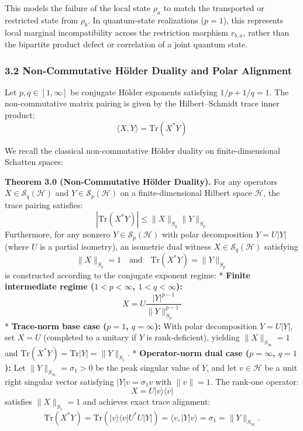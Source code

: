 \documentclass[
]{article}
\begin{document}
This models the failure of the local state \(\rho_a\) to match the transported or restricted state from \(\rho_b\). In quantum-state realizations (\(p=1\)), this represents local marginal incompatibility across the restriction morphism \(r_{b,a}\), rather than the bipartite product defect or correlation of a joint quantum state.

\subsubsection{3.2 Non-Commutative Hölder Duality and Polar Alignment}\label{non-commutative-huxf6lder-duality-and-polar-alignment}

Let \(p, q \in [1, \infty]\) be conjugate Hölder exponents satisfying \(1/p + 1/q = 1\). The non-commutative matrix pairing is given by the Hilbert--Schmidt trace inner product:
\[\langle X, Y \rangle = \mathrm{Tr}(X^* Y)\]

We recall the classical non-commutative Hölder duality on finite-dimensional Schatten spaces:

\textbf{Theorem 3.0 (Non-Commutative Hölder Duality).} For any operators \(X \in \mathcal{S}_q(\mathcal{H})\) and \(Y \in \mathcal{S}_p(\mathcal{H})\) on a finite-dimensional Hilbert space \(\mathcal{H}\), the trace pairing satisfies:
\[|\mathrm{Tr}(X^* Y)| \le \|X\|_{S_q} \|Y\|_{S_p}\]
Furthermore, for any nonzero \(Y \in \mathcal{S}_p(\mathcal{H})\) with polar decomposition \(Y = U |Y|\) (where \(U\) is a partial isometry), an isometric dual witness \(X \in \mathcal{S}_q(\mathcal{H})\) satisfying
\[\|X\|_{S_q} = 1 \quad \text{and} \quad \mathrm{Tr}(X^* Y) = \|Y\|_{S_p}\]
is constructed according to the conjugate exponent regime:
* \textbf{Finite intermediate regime (\(1 < p < \infty\), \(1 < q < \infty\)):}
\[X = U \frac{|Y|^{p-1}}{\|Y\|_{S_p}^{p-1}}\]
* \textbf{Trace-norm base case (\(p = 1\), \(q = \infty\)):} With polar decomposition \(Y = U |Y|\), set \(X = U\) (completed to a unitary if \(Y\) is rank-deficient), yielding \(\|X\|_{S_\infty} = 1\) and \(\mathrm{Tr}(X^* Y) = \mathrm{Tr}|Y| = \|Y\|_{S_1}\).
* \textbf{Operator-norm dual case (\(p = \infty\), \(q = 1\)):} Let \(\|Y\|_{S_\infty} = \sigma_1 > 0\) be the peak singular value of \(Y\), and let \(v \in \mathcal{H}\) be a unit right singular vector satisfying \(|Y| v = \sigma_1 v\) with \(\|v\| = 1\). The rank-one operator:
\[X = U |v\rangle\langle v|\]
satisfies \(\|X\|_{S_1} = 1\) and achieves exact trace alignment:
\[\mathrm{Tr}(X^* Y) = \mathrm{Tr}(|v\rangle\langle v| U^* U |Y|) = \langle v, |Y| v \rangle = \sigma_1 = \|Y\|_{S_\infty}.\]
\end{document}
